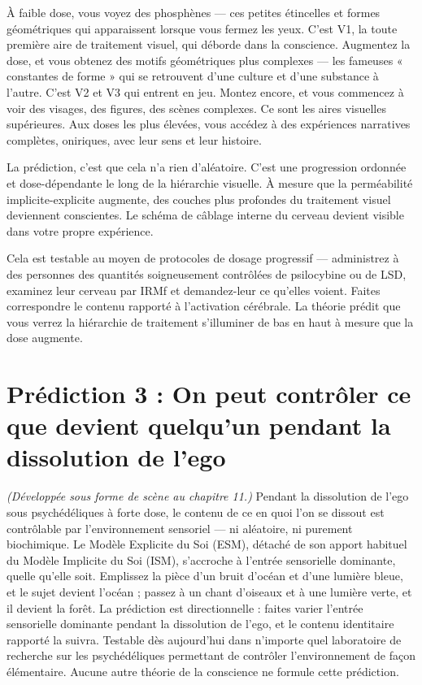 \documentclass[11pt, twoside, openright]{book}
\begin{document}
À faible dose, vous voyez des phosphènes --- ces petites étincelles et formes géométriques qui apparaissent lorsque vous fermez les yeux. C'est V1, la toute première aire de traitement visuel, qui déborde dans la conscience. Augmentez la dose, et vous obtenez des motifs géométriques plus complexes --- les fameuses « constantes de forme » qui se retrouvent d'une culture et d'une substance à l'autre. C'est V2 et V3 qui entrent en jeu. Montez encore, et vous commencez à voir des visages, des figures, des scènes complexes. Ce sont les aires visuelles supérieures. Aux doses les plus élevées, vous accédez à des expériences narratives complètes, oniriques, avec leur sens et leur histoire.

La prédiction, c'est que cela n'a rien d'aléatoire. C'est une progression ordonnée et dose-dépendante le long de la hiérarchie visuelle. À mesure que la perméabilité implicite-explicite augmente, des couches plus profondes du traitement visuel deviennent conscientes. Le schéma de câblage interne du cerveau devient visible dans votre propre expérience.

Cela est testable au moyen de protocoles de dosage progressif --- administrez à des personnes des quantités soigneusement contrôlées de psilocybine ou de LSD, examinez leur cerveau par IRMf et demandez-leur ce qu'elles voient. Faites correspondre le contenu rapporté à l'activation cérébrale. La théorie prédit que vous verrez la hiérarchie de traitement s'illuminer de bas en haut à mesure que la dose augmente.

\section*{Prédiction 3 : On peut contrôler ce que devient quelqu'un pendant la dissolution de l'ego}

\textit{(Développée sous forme de scène au chapitre 11.)} Pendant la dissolution de l'ego sous psychédéliques à forte dose, le contenu de ce en quoi l'on se dissout est contrôlable par l'environnement sensoriel --- ni aléatoire, ni purement biochimique. Le Modèle Explicite du Soi (ESM), détaché de son apport habituel du Modèle Implicite du Soi (ISM), s'accroche à l'entrée sensorielle dominante, quelle qu'elle soit. Emplissez la pièce d'un bruit d'océan et d'une lumière bleue, et le sujet devient l'océan ; passez à un chant d'oiseaux et à une lumière verte, et il devient la forêt. La prédiction est directionnelle : faites varier l'entrée sensorielle dominante pendant la dissolution de l'ego, et le contenu identitaire rapporté la suivra. Testable dès aujourd'hui dans n'importe quel laboratoire de recherche sur les psychédéliques permettant de contrôler l'environnement de façon élémentaire. Aucune autre théorie de la conscience ne formule cette prédiction.
\end{document}
